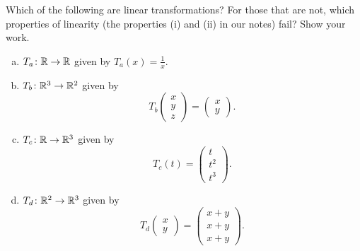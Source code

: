 \documentclass[12pt]{article} %
\begin{document}
\newpage
\begin{problem}
Which of the following are linear transformations? For those that are not, which properties of linearity (the properties (i) and (ii) in our notes) fail? Show your work.
\begin{enumerate}[(a)]
    \item $T_a \colon \mathbb{R} \to \mathbb{R}$ given by $T_a(x)=\frac{1}{x}$.
    \item $T_b \colon \mathbb{R}^3 \to \mathbb{R}^2$ given by
    \[
    T_b \begin{pmatrix} x\\ y\\ z \end{pmatrix}
    = \begin{pmatrix} x\\ y \end{pmatrix}.
    \]
    \item $T_c \colon \mathbb{R} \to \mathbb{R}^3$ given by
    \[
    T_c(t)=\begin{pmatrix} t\\ t^2\\ t^3 \end{pmatrix}.
    \]
    \item $T_d \colon \mathbb{R}^2 \to \mathbb{R}^3$ given by
    \[
    T_d \begin{pmatrix} x\\ y \end{pmatrix}
    = \begin{pmatrix} x+y\\ x+y\\ x+y \end{pmatrix}.
    \]
\end{enumerate}
\end{problem}
\end{document}
